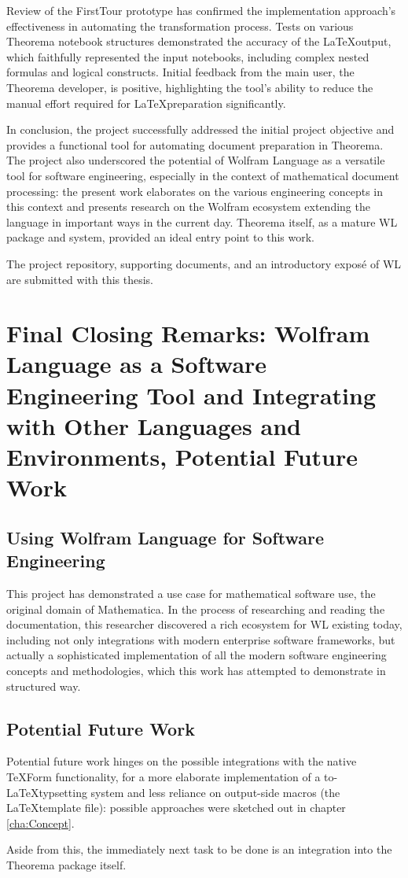 Review of the FirstTour prototype has confirmed the implementation approach's effectiveness in automating the transformation process. Tests on various Theorema notebook structures demonstrated the accuracy of the \LaTeX output, which faithfully represented the input notebooks, including complex nested formulas and logical constructs. Initial feedback from the main user, the Theorema developer, is positive, highlighting the tool's ability to reduce the manual effort required for \LaTeX preparation significantly. 

In conclusion, the project successfully addressed the initial project objective and provides a functional tool for automating document preparation in Theorema. The project also underscored the potential of Wolfram Language as a versatile tool for software engineering, especially in the context of mathematical document processing: the present work elaborates on the various engineering concepts in this context and presents research on the Wolfram ecosystem extending the language in important ways in the current day. Theorema itself, as a mature WL package and system, provided an ideal entry point to this work.

The project repository, supporting documents, and an introductory exposé of WL are submitted with this thesis.


\section{Final Closing Remarks: Wolfram Language as a Software Engineering Tool and Integrating with Other Languages and Environments, Potential Future Work}

\subsection{Using Wolfram Language for Software Engineering}

This project has demonstrated a use case for mathematical software use, the original domain of Mathematica. In the process of researching and reading the documentation, this researcher discovered a rich ecosystem for WL existing today, including not only integrations with modern enterprise software frameworks, but actually a sophisticated implementation of all the modern software engineering concepts and methodologies, which this work has attempted to demonstrate in structured way.

\subsection{Potential Future Work}

Potential future work hinges on the possible integrations with the native TeXForm functionality, for a more elaborate implementation of a to-\LaTeX typsetting system and less reliance on output-side macros (the \LaTeX template file): possible approaches were sketched out in chapter \ref{cha:Concept}.

Aside from this, the immediately next task to be done is an integration into the Theorema package itself.